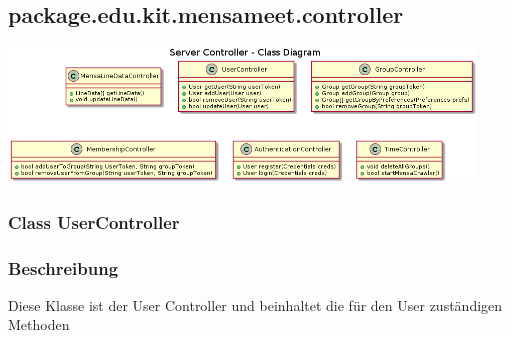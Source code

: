 \documentclass[a4paper]{scrreprt}
\begin{document}



\subsection{package.edu.kit.mensameet.controller}
\begin{center}
	\includegraphics[width=0.93\textwidth]{Klassendiagramme/serverControllerCD.png}
\end{center}
\subsubsection{Class UserController}
\subsubsection*{Beschreibung}
Diese Klasse ist der User Controller und beinhaltet die für den User zuständigen Methoden
\end{document}
